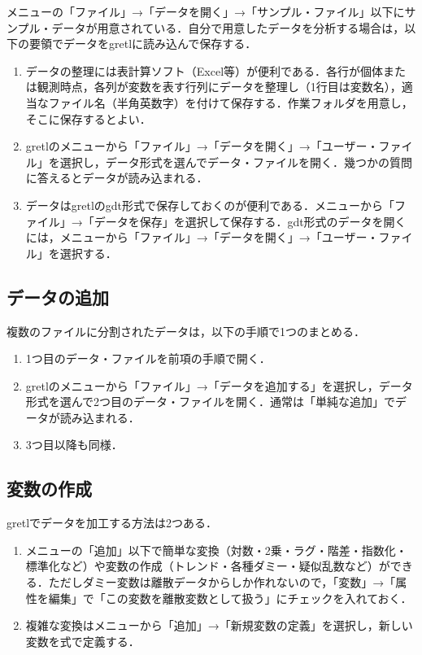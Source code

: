 \documentclass[
]{jlreq}
\providecommand{\tightlist}{%
  \setlength{\itemsep}{0pt}\setlength{\parskip}{0pt}}
\begin{document}
メニューの「ファイル」→「データを開く」→「サンプル・ファイル」以下にサンプル・データが用意されている．自分で用意したデータを分析する場合は，以下の要領でデータをgretlに読み込んで保存する．

\begin{enumerate}
\def\labelenumi{\arabic{enumi}.}
\tightlist
\item
  データの整理には表計算ソフト（Excel等）が便利である．各行が個体または観測時点，各列が変数を表す行列にデータを整理し（1行目は変数名），適当なファイル名（半角英数字）を付けて保存する．作業フォルダを用意し，そこに保存するとよい．
\item
  gretlのメニューから「ファイル」→「データを開く」→「ユーザー・ファイル」を選択し，データ形式を選んでデータ・ファイルを開く．幾つかの質問に答えるとデータが読み込まれる．
\item
  データはgretlのgdt形式で保存しておくのが便利である．メニューから「ファイル」→「データを保存」を選択して保存する．gdt形式のデータを開くには，メニューから「ファイル」→「データを開く」→「ユーザー・ファイル」を選択する．
\end{enumerate}

\subsection{データの追加}\label{ux30c7ux30fcux30bfux306eux8ffdux52a0}

複数のファイルに分割されたデータは，以下の手順で1つのまとめる．

\begin{enumerate}
\def\labelenumi{\arabic{enumi}.}
\tightlist
\item
  1つ目のデータ・ファイルを前項の手順で開く．
\item
  gretlのメニューから「ファイル」→「データを追加する」を選択し，データ形式を選んで2つ目のデータ・ファイルを開く．通常は「単純な追加」でデータが読み込まれる．
\item
  3つ目以降も同様．
\end{enumerate}

\subsection{変数の作成}\label{ux5909ux6570ux306eux4f5cux6210}

gretlでデータを加工する方法は2つある．

\begin{enumerate}
\def\labelenumi{\arabic{enumi}.}
\tightlist
\item
  メニューの「追加」以下で簡単な変換（対数・2乗・ラグ・階差・指数化・標準化など）や変数の作成（トレンド・各種ダミー・疑似乱数など）ができる．ただしダミー変数は離散データからしか作れないので，「変数」→「属性を編集」で「この変数を離散変数として扱う」にチェックを入れておく．
\item
  複雑な変換はメニューから「追加」→「新規変数の定義」を選択し，新しい変数を式で定義する．
\end{enumerate}
\end{document}
